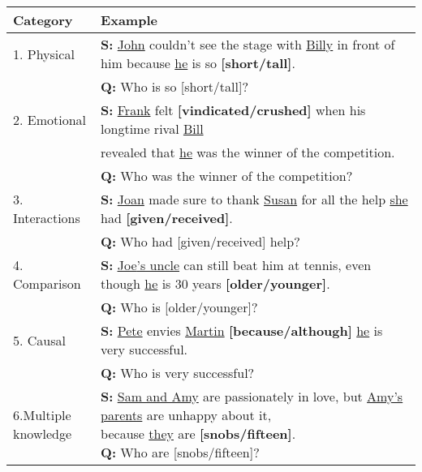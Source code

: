 

\begin{tabular}{ | l | l | }
    \hline
    \textbf{Category}  & \textbf{Example} \\ \hline
    1. Physical &\textbf{S:} \underline{John} couldn't see the stage with \underline{Billy} in front of him because \underline{he} is so \textbf{[short/tall]}.\\&\textbf{Q:} Who is so [short/tall]? \\\hline
    
    2. Emotional &\textbf{S:}  \underline{Frank} felt \textbf{[vindicated/crushed]} when his longtime rival \underline{Bill}\\&revealed that \underline{he} was the winner of the competition.\\&\textbf{Q:} Who was the winner of the competition?\\\hline
    
    3. Interactions &\textbf{S:} \underline{Joan} made sure to thank \underline{Susan} for all the help \underline{she} had \textbf{[given/received]}. \\&\textbf{Q:} Who had [given/received] help?\\ \hline
    
    4. Comparison &\textbf{S:} \underline{\underline{Joe}'s uncle} can still beat him at tennis, even though \underline{he} is 30 years \textbf{[older/younger]}.\\&\textbf{Q:} Who is [older/younger]?\\ \hline
    
    5. Causal &\textbf{S:} \underline{Pete} envies \underline{Martin} \textbf{[because/although]} \underline{he} is very successful.\\&\textbf{Q:} Who is very successful? \\ \hline 
    
    6.\makecell{Multiple\\ knowledge} &\makecell[l]{\textbf{S:}    
    \underline{Sam and Amy} are passionately in love, but \underline{Amy's parents} are unhappy about it,\\ because \underline{they} are \textbf{[snobs/fifteen]}.  \\\textbf{Q:} Who are [snobs/fifteen]?}\\ \hline
\end{tabular}

